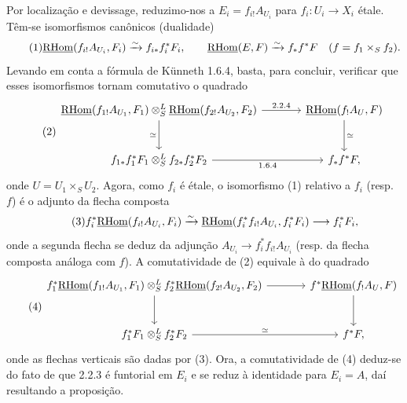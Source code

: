 Por localização e devissage, reduzimo-nos a $E_i=f_{i!}A_{U_i}$ para $f_i:U_i\to X_i$ étale. Têm-se isomorfismos canônicos (dualidade)
\begin{equation}\tag{1}
\underline{\mathrm{RHom}}(f_{i!}A_{U_i},F_i)\xrightarrow{\sim}f_{i*}f_i^{*}F_i,
\qquad
\underline{\mathrm{RHom}}(E,F)\xrightarrow{\sim}f_{*}f^{*}F\quad(f=f_1\times_S f_2).
\end{equation}
Levando em conta a fórmula de Künneth 1.6.4, basta, para concluir, verificar que esses isomorfismos tornam comutativo o quadrado
\begin{equation}\tag{2}
\begin{tikzcd}[column sep=large,row sep=large]
\uRHom(f_{1!}A_{U_1},F_1)\otimes^{L}_{S}\uRHom(f_{2!}A_{U_2},F_2) \arrow[r,"2.2.4"] \arrow[d,"\simeq"'] & \uRHom(f_{!}A_U,F) \arrow[d,"\simeq"]\\
f_{1*}f_1^{*}F_1\otimes^{L}_{S}f_{2*}f_2^{*}F_2 \arrow[r,"1.6.4"'] & f_{*}f^{*}F,
\end{tikzcd}
\end{equation}
onde $U=U_1\times_S U_2$. Agora, como $f_i$ é étale, o isomorfismo (1) relativo a $f_i$ (resp. $f$) é o adjunto da flecha composta
\begin{equation}\tag{3}
f_i^{*}\underline{\mathrm{RHom}}(f_{i!}A_{U_i},F_i)\xrightarrow{\sim}\underline{\mathrm{RHom}}(f_i^{*}f_{i!}A_{U_i},f_i^{*}F_i)\longrightarrow f_i^{*}F_i,
\end{equation}
onde a segunda flecha se deduz da adjunção $A_{U_i}\to f_i^{*}f_{i!}A_{U_i}$ (resp. da flecha composta análoga com $f$). A comutatividade de (2) equivale à do quadrado
\begin{equation}\tag{4}
\begin{tikzcd}[column sep=large,row sep=large]
f_1^{*}\uRHom(f_{1!}A_{U_1},F_1)\otimes^{L}_{S}f_2^{*}\uRHom(f_{2!}A_{U_2},F_2) \arrow[r] \arrow[d] & f^{*}\uRHom(f_{!}A_U,F) \arrow[d]\\
f_1^{*}F_1\otimes^{L}_{S}f_2^{*}F_2 \arrow[r,"\simeq"] & f^{*}F,
\end{tikzcd}
\end{equation}
onde as flechas verticais são dadas por (3). Ora, a comutatividade de (4) deduz-se do fato de que 2.2.3 é funtorial em $E_i$ e se reduz à identidade para $E_i=A$, daí resultando a proposição.

